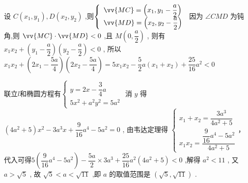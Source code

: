 \begin{enumerate}
\begin{jieda}
\begin{enumerate}
                设 $C\left( {{x}_{1},{y}_{1}}\right) ,D\left( {{x}_{2},{y}_{2}}\right)$ ,则$\left\{\begin{array}{l}
                     \vv{MC} = \left(x_1, y_1 - \dfrac{a}{2}\right)  \\
                     \vv{MD} = \left(x_2, y_2 - \dfrac{a}{2}\right)
                \end{array}\right.$
                因为 $\angle {CMD}$ 为钝角,则 $\vv{MC} \cdot  \vv{MD} < 0$ ,且 $M\left( {0,\dfrac{a}{2}}\right)$ ,
                则有 ${x}_{1}{x}_{2} + \left( {{y}_{1} - \dfrac{a}{2}}\right) \left( {{y}_{2} - \dfrac{a}{2}}\right)  < 0$ ,
                所以 ${x}_{1}{x}_{2} + \left( {2{x}_{1} - \dfrac{5a}{4}}\right) \left( {2{x}_{2} - \dfrac{5a}{4}}\right)  = 5{x}_{1}{x}_{2} - \dfrac{5}{2}a\left( {{x}_{1} + {x}_{2}}\right)  + \dfrac{25}{16}{a}^{2} < 0$ 
                
                联立$l$和椭圆方程有$\left\{  \begin{array}{l} y = {2x} - \dfrac{3}{4}a \\  5{x}^{2} + {a}^{2}{y}^{2} = 5{a}^{2} \end{array}\right.$ 消 $y$ 得 $\left( {4{a}^{2} + 5}\right) {x}^{2} - 3{a}^{3}x + \dfrac{9}{16}{a}^{4} - 5{a}^{2} = 0$ ,
                由韦达定理得 $\left \{\begin{array}{l}
                     {x}_{1} + {x}_{2} = \dfrac{3{a}^{3}}{4{a}^{2} + 5} \\
                     {x}_{1}{x}_{2} = \dfrac{\dfrac{9}{16}{a}^{4} - 5{a}^{2}}{4{a}^{2} + 5}
                \end{array}\right .$，代入可得$5\left( {\dfrac{9}{16}{a}^{4} - 5{a}^{2}}\right)  - \dfrac{5a}{2} \times  3{a}^{3} + \dfrac{25}{16}{a}^{2}\left( {4{a}^{2} + 5}\right)  < 0$ ,解得 ${a}^{2} < {11}$ ,
                又 $a > \sqrt{5}$ ,
                故 $\sqrt{5} < a < \sqrt{11}$ ,即 $a$ 的取值范围是 $\left( {\sqrt{5},\sqrt{11}}\right)$ .
        \end{enumerate}
    \end{jieda}


\end{enumerate}
